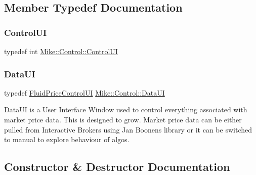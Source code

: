 \subsection{Member Typedef Documentation}
\mbox{\label{class_mike_1_1_control_a313ca882c409ba9bed4837acf6d17a72}} 
\subsubsection{\texorpdfstring{Control\+UI}{ControlUI}}
{\footnotesize\ttfamily typedef int \hyperlink{class_mike_1_1_control_a313ca882c409ba9bed4837acf6d17a72}{Mike\+::\+Control\+::\+Control\+UI}\hspace{0.3cm}{\ttfamily [private]}}

\mbox{\label{class_mike_1_1_control_addbe39ef40982f0a4002b6f74091a799}} 
\subsubsection{\texorpdfstring{Data\+UI}{DataUI}}
{\footnotesize\ttfamily typedef \hyperlink{class_fluid_price_control_u_i}{Fluid\+Price\+Control\+UI} \hyperlink{class_mike_1_1_control_addbe39ef40982f0a4002b6f74091a799}{Mike\+::\+Control\+::\+Data\+UI}\hspace{0.3cm}{\ttfamily [private]}}

Data\+UI is a User Interface Window used to control everything associated with market price data. This is designed to grow. Market price data can be either pulled from Interactive Brokers using Jan Boonen\textquotesingle{}s library or it can be switched to \textquotesingle{}manual\textquotesingle{} to explore behaviour of algos. 

\subsection{Constructor \& Destructor Documentation}
\mbox{\label{class_mike_1_1_control_ac9a2e3b56773b1eadab7297327a9fbcc}} 
